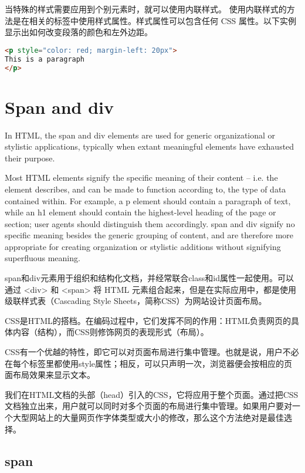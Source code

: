 当特殊的样式需要应用到个别元素时，就可以使用内联样式。 使用内联样式的方法是在相关的标签中使用样式属性。样式属性可以包含任何 CSS 属性。以下实例显示出如何改变段落的颜色和左外边距。

\begin{lstlisting}[language=HTML]
<p style="color: red; margin-left: 20px">
This is a paragraph
</p>
\end{lstlisting}




\chapter{Span and div}


In HTML, the span and div elements are used for generic organizational or stylistic applications, typically when extant meaningful elements have exhausted their purpose.




Most HTML elements signify the specific meaning of their content – i.e. the element describes, and can be made to function according to, the type of data contained within. For example, a p element should contain a paragraph of text, while an h1 element should contain the highest-level heading of the page or section; user agents should distinguish them accordingly. span and div signify no specific meaning besides the generic grouping of content, and are therefore more appropriate for creating organization or stylistic additions without signifying superfluous meaning.


span和div元素用于组织和结构化文档，并经常联合class和id属性一起使用。可以通过 <div> 和 <span> 将 HTML 元素组合起来，但是在实际应用中，都是使用级联样式表（Cascading Style Sheets，简称CSS）为网站设计页面布局。

CSS是HTML的搭档。在编码过程中，它们发挥不同的作用：HTML负责网页的具体内容（结构），而CSS则修饰网页的表现形式（布局）。

CSS有一个优越的特性，即它可以对页面布局进行集中管理。也就是说，用户不必在每个标签里都使用style属性；相反，可以只声明一次，浏览器便会按相应的页面布局效果来显示文本。

我们在HTML文档的头部（head）引入的CSS，它将应用于整个页面。通过把CSS文档独立出来，用户就可以同时对多个页面的布局进行集中管理。如果用户要对一个大型网站上的大量网页作字体类型或大小的修改，那么这个方法绝对是最佳选择。

\section{span}

